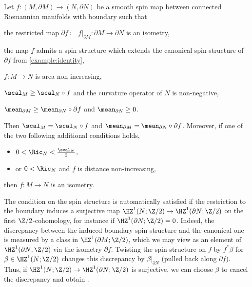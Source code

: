 \documentclass[a4paper,11pt]{amsart}
\numberwithin{equation}{section}
\begin{document}
\begin{theorem} \label{APS_lott}
    Let \(f \colon (M, \partial M) \to (N, \partial N)\) be a smooth spin map between connected Riemannian manifolds with boundary such that
    \begin{myenumi}
        \item the restricted map \(\partial f \coloneqq f|_{\partial M} \colon \partial M \to \partial N\) is an isometry, \label{item:boundary_isometry}
        \item the map \(f\) admits a spin structure which extends the canonical spin structure of \(\partial f\) from \cref{example:identity},\label{item:spin_condition}
        \item \(f \colon M \to N\) is area non-increasing, \label{item:area_condition}
        \item \(\scal_{M} \geq \scal_{N} \circ f\) and the curvature operator of \(N\) is non-negative, \label{item:scal_condition}
        \item \(\mean_{\partial M} \geq \mean_{\partial N} \circ \partial f\) and \(\mean_{\partial N} \geq 0\). \label{item:mean_condition}
    \end{myenumi}
    Then \(\scal_M = \scal_N \circ f\) and \(\mean_{\partial M} = \mean_{\partial N} \circ \partial f\).
    Moreover, if one of the two following additional conditions holds,
    \begin{itemize}
        \item \(0 <  \Ric_N < \frac{\scal_N}{2} \),
        \item or \(0 < \Ric_N\) and \(f\) is distance non-increasing,
    \end{itemize}
    then \(f \colon M \to N\) is an isometry.
\end{theorem}
\begin{remark}
    The condition on the spin structure  is automatically satisfied if the restriction to the boundary induces a surjective map \(\HZ^1(N; \Z/2) \to \HZ^1(\partial N; \Z/2)\) on the first \(\Z/2\)-cohomology, for instance if \(\HZ^1(\partial N; \Z/2) = 0\).
    Indeed, the discrepancy between the induced boundary spin structure and the canonical one is measured by a class in \(\HZ^1(\partial M;\Z/2)\), which we may view as an element of \(\HZ^1(\partial N;\Z/2)\) via the isometry \(\partial f\).
    Twisting the spin structure on \(f\) by \(f^\ast\beta\) for \(\beta \in \HZ^1(N;\Z/2)\) changes this discrepancy by \(\beta|_{\partial N}\) (pulled back along \(\partial f\)).
    Thus, if \(\HZ^1(N;\Z/2) \to \HZ^1(\partial N;\Z/2)\) is surjective, we can choose \(\beta\) to cancel the discrepancy and obtain .
\end{remark}
\end{document}
